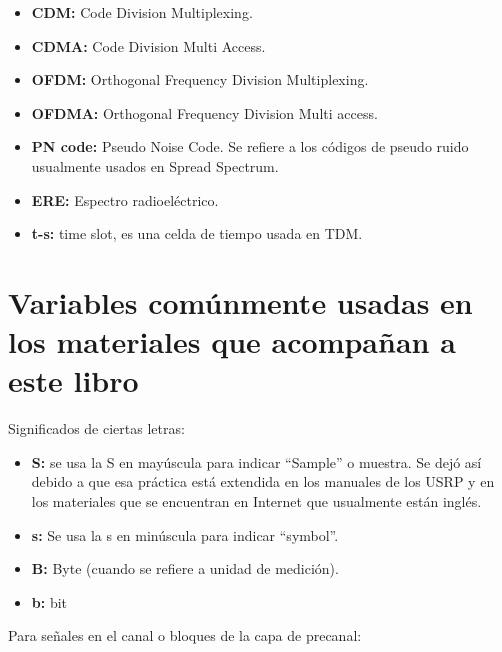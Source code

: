 \begin{itemize}
	\item  \textbf{CDM:} Code Division Multiplexing.
	\item  \textbf{CDMA:} Code Division Multi Access.
	\item  \textbf{OFDM:} Orthogonal Frequency Division Multiplexing.
	\item  \textbf{OFDMA:} Orthogonal Frequency Division Multi access.
	\item  \textbf{PN code:}  Pseudo Noise Code. Se refiere a los códigos de pseudo ruido usualmente usados en Spread Spectrum.
	\item  \textbf{ERE:} Espectro radioeléctrico.
	\item  \textbf{t-s:} time slot, es una celda de tiempo usada en TDM.
\end{itemize}


\section{Variables comúnmente usadas en los materiales que acompañan a este libro}

Significados de ciertas letras:

\begin{itemize}
	\item  \textbf{S:} se usa la S en mayúscula para indicar “Sample” o muestra. Se dejó así debido a que esa práctica está extendida en los manuales de los USRP y en los materiales que se encuentran en Internet que usualmente están inglés.
	\item  \textbf{s:} Se usa la s en minúscula para indicar “symbol”.
	\item  \textbf{B:} Byte (cuando se refiere a unidad de medición).
	\item  \textbf{b:} bit
\end{itemize}

Para señales en el canal o bloques de la capa de precanal:


